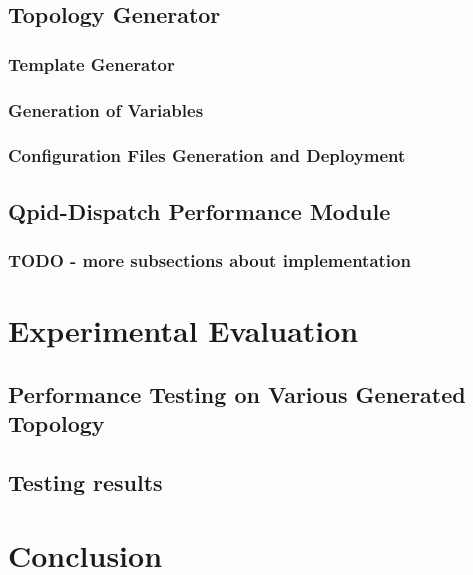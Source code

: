 \section{Topology Generator}

\subsection{Template Generator}

\subsection{Generation of Variables}

\subsection{Configuration Files Generation and Deployment}

\section{Qpid-Dispatch Performance Module}

\subsection{TODO - more subsections about implementation}

\chapter{Experimental Evaluation}
\label{Experimental Evaluation}

\section{Performance Testing on Various Generated Topology}

\section{Testing results}

\chapter{Conclusion}
\label{Conclusion}

